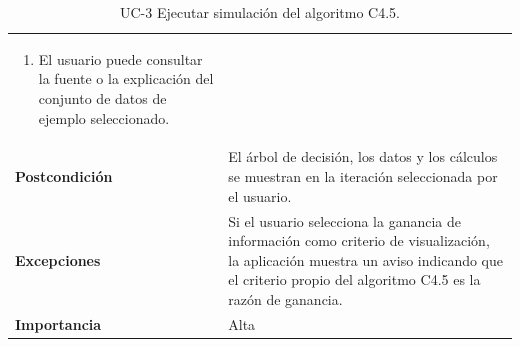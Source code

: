 \begin{table}[p]
\begin{tabularx}{\linewidth}{p{} p{}}
\begin{enumerate}
            \item El usuario puede consultar la fuente o la explicación del conjunto de datos de ejemplo seleccionado.
        \end{enumerate} \\
        \textbf{Postcondición} & El árbol de decisión, los datos y los cálculos se muestran en la iteración seleccionada por el usuario. \\
        \textbf{Excepciones} & Si el usuario selecciona la ganancia de información como criterio de visualización, la aplicación muestra un aviso indicando que el criterio propio del algoritmo C4.5 es la razón de ganancia. \\
        \textbf{Importancia} & Alta \\
        \bottomrule
    \end{tabularx}
    \caption{UC-3 Ejecutar simulación del algoritmo C4.5.}
    \label{tabla:uc_3}
\end{table}


